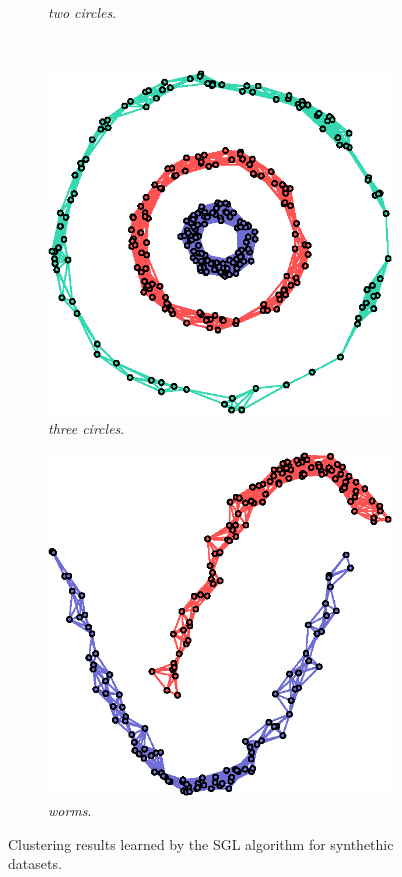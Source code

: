 \begin{figure}[!htb]
\begin{subfigure}[b]{0.23\textwidth}
        \caption{\textit{two circles}.}
    \end{subfigure}
    ~
    \begin{subfigure}[b]{0.23\textwidth}
        \includegraphics[width=\textwidth]{clusters/circles3.eps}
        \caption{\textit{three circles}.}
    \end{subfigure}
    \begin{subfigure}[b]{0.23\textwidth}
        \includegraphics[width=\textwidth]{clusters/worms.eps}
        \caption{\textit{worms}.}
    \end{subfigure}
    \caption{Clustering results learned by the \textsf{SGL} algorithm for synthethic datasets.}
    \label{fig:clusters}
\end{figure}


